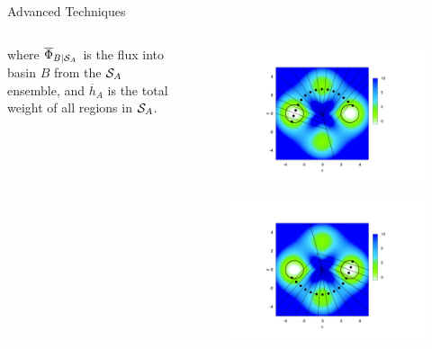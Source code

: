 \documentclass[final]{beamer}
\begin{document}
\begin{columns}[t]
\begin{column}{.25 \linewidth}
\begin{block}{Advanced Techniques}
\begin{columns}[t]
\begin{column}{.65\linewidth}
	  where $\overline{\Phi}_{B \mid {\cal S}_A}$ is the flux into basin $B$ from the ${\cal S}_A$ ensemble, and $\overline{h}_A$ is the total weight of all regions in ${\cal S}_A$.
	    \end{column}
	    \begin{column}{.25\linewidth}
	      \begin{figure}
 		\includegraphics[width=3 in]{images/contvorf.pdf}
	      \end{figure}
	      \begin{figure}
 		\includegraphics[width=3 in]{images/contvorr.pdf}
	      \end{figure}
	    \end{column}
	  \end{columns}
	  
        \end{block}
      \end{column}


\end{columns}
\end{document}
